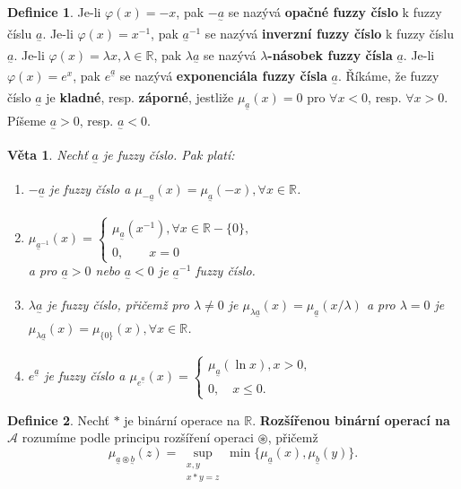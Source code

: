 \documentclass[a4]{report}
\newcommand{\fa}{\underset{^\sim}a}
\newcommand{\fb}{\underset{^\sim}b}
\newcommand{\mua}{\mu_{\fa}}
\newcommand{\mub}{\mu_{\fb}}
\newtheorem{theorem}{Věta}
\theoremstyle{definition}
\newtheorem{definition}{Definice}[section]
\begin{document}
{\begin{definition}
Je-li $\varphi(x)=-x$, pak $-\fa$ se nazývá \textbf{opačné fuzzy číslo} k fuzzy číslu $\fa$. Je-li $\varphi(x)=x^{-1}$, pak $\fa^{-1}$ se nazývá \textbf{inverzní fuzzy číslo} k fuzzy číslu $\fa$. Je-li $\varphi(x)=\lambda x, \lambda \in \mathbb{R}$, pak $\lambda \fa$ se nazývá {\boldmath$\lambda$}\textbf{-násobek fuzzy čísla} $\fa$. Je-li $\varphi(x)=e^{x}$, pak $e^{\fa}$ se nazývá \textbf{exponenciála fuzzy čísla} $\fa$. Říkáme, že fuzzy číslo $\fa$ je \textbf{kladné}, resp. \textbf{záporné}, jestliže $\mua(x)=0$ pro $\forall x < 0$, resp. $\forall x > 0$. Píšeme $\fa>0$, resp. $\fa < 0$.
\end{definition}

\begin{theorem}
Nechť $\fa$ je fuzzy číslo. Pak platí:
\begin{enumerate}
\item $-\fa$ je fuzzy číslo a $\mu_{-\fa}(x)=\mua(-x), \forall x \in \mathbb{R}$.
\item $\mu_{\fa^{-1}}(x) =
	\begin{cases}
		\mua(x^{-1}), \forall x \in \mathbb{R} - \lbrace 0 \rbrace, \\
		0, \qquad x=0
    \end{cases}$ \\
    a pro $\fa > 0$ nebo $\fa < 0$ je $\fa^{-1}$ fuzzy číslo.
\item $\lambda\fa$ je fuzzy číslo, přičemž pro $\lambda \neq 0$ je $\mu_{\lambda\fa}(x)=\mua(x/\lambda)$ a pro $\lambda = 0$ je $\mu_{\lambda\fa}(x) = \mu_{\lbrace 0 \rbrace}(x), \forall x \in \mathbb{R}$.
\item $e^{\fa}$ je fuzzy číslo a $\mu_{e^{\fa}}(x) = \begin{cases}
\mua(\ln{x}), x > 0, \\
0, \quad x \leq 0.
\end{cases}$
\end{enumerate}
\end{theorem}

\begin{definition}
Nechť $\ast$ je binární operace na $\mathbb{R}$. \textbf{Rozšířenou binární operací na} $\mathcal{A}$ rozumíme podle principu rozšíření operaci $\circledast$, přičemž
\begin{equation*}
\mu_{\fa \circledast \fb}(z) = \sup\limits_{\substack{x, y \\ x \ast y = z}} \min \lbrace \mua(x), \mub(y) \rbrace.
\end{equation*}
\end{definition}

}
\end{document}
